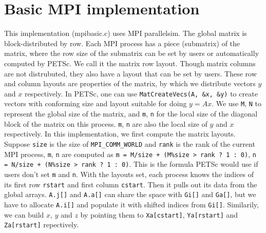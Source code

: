 \documentclass[creativecommons]{eptcs}
\begin{document}
\section{Basic MPI implementation}
\label{sec:mpibasic}
This implementation (mpibasic.c) uses MPI parallelsim.
The global matrix is block-distributed by row. Each MPI process has a piece (submatrix) of the
matrix, where the row size of the submatrix can be set by users
or automatically computed by PETSc. We call it the matrix row layout.
Though matrix columns are not distrubuted, they also have a layout that can be set by users.
These row and column layouts are properties of the matrix, by which we distribute vectors $y$ and $x$ respectively.
In PETSc, one can use {\tt MatCreateVecs(A, \&x, \&y)} to create
vectors with conforming size and layout suitable for doing $y = Ax$.
We use {\tt M}, {\tt N} to represent the global size of the matrix,
and {\tt m}, {\tt n} for the local size of the diagonal block of the matrix
on this process. {\tt m}, {\tt n} are also the local size of $y$ and $x$ respectively.
In this implementation, we first compute the matrix layouts.
Suppose {\tt size} is the size of {\tt MPI_COMM_WORLD} and {\tt rank} is the rank of the current MPI process,
{\tt m}, {\tt n} are computed as \verb|m = M/size + (M%size > rank ? 1 : 0)|,
\verb|n = N/size + (N%size > rank ? 1 : 0)|. This is the formula PETSc would use
if users don't set {\tt m} and {\tt n}.
With the layouts set,
each process knows the indices of its first row {\tt rstart} and first column {\tt cstart}.
Then it pulls out its data from the global arrays.
{\tt A.j[]} and {\tt A.a[]} can share the space with {\tt Gi[]} and {\tt Ga[]}, but we
have to allocate {\tt A.i[]} and populate it with shifted indices from {\tt Gi[]}.
Similarily, we can build $x$, $y$ and $z$ by pointing them to
{\tt Xa[cstart]}, {\tt Ya[rstart]} and {\tt Za[rstart]} repectively.
\end{document}
